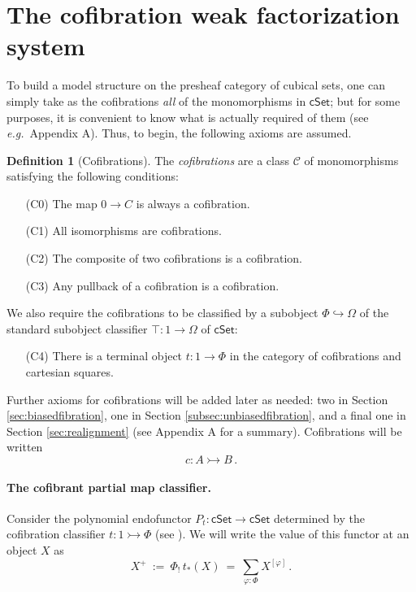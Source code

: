 \documentclass[11pt]{amsart}
\newcommand{\eg}{\emph{e.g.}}
\newcommand{\cSet}{\ensuremath{\mathsf{cSet}}}
\newcommand{\hook}{\ensuremath{\hookrightarrow}}
\newcommand{\mono}{\ensuremath{\rightarrowtail}}
\renewcommand{\to}{\ensuremath{\rightarrow}}
\theoremstyle{remark}
\theoremstyle{definition}
\newtheorem{definition}[theorem]{Definition}
\begin{document}
\section{The cofibration weak factorization system}\label{sec:cofibrations}

To build a model structure on the presheaf category of cubical sets, one can simply take as the cofibrations \emph{all} of the monomorphisms in $\cSet$; but for some purposes, it is convenient to know what is actually required of them (see \eg\ Appendix A). Thus, to begin, the following axioms are assumed.
 
\begin{definition}[Cofibrations]\label{def:cofibration}
The \emph{cofibrations} are a class $\mathcal{C}$ of monomorphisms satisfying the following conditions:
\begin{enumerate}
\item[(C0)] The map $0\to C$ is always a cofibration.
\item[(C1)] All isomorphisms are cofibrations.
\item[(C2)] The composite of two cofibrations is a cofibration.
\item[(C3)] Any pullback of a cofibration is a cofibration.
\end{enumerate}
We also require the cofibrations to be classified by a subobject $\Phi \hook \Omega$ of the standard subobject classifier $\top: 1 \to \Omega$ of $\mathsf{cSet}$:
\begin{enumerate}
\item[(C4)] There is a terminal object $t:1\to\Phi$ in the category of cofibrations and cartesian squares.
\end{enumerate}
Further axioms for cofibrations will be added later as needed: two in Section \ref{sec:biasedfibration}, one in Section \ref{subsec:unbiasedfibration}, and a final one in Section \ref{sec:realignment} (see Appendix A for a summary).  %
 Cofibrations will be written $$c : A \mono B\,.$$ 
\end{definition}

\paragraph{The cofibrant partial map classifier.}
Consider the polynomial endofunctor $P_t : \cSet\to \cSet$ determined by the cofibration classifier $t : 1 \mono \Phi$ (see  \cite{GK}).  We will write the value of this functor at an object $X$ as 
\begin{equation}\label{eq:partialmapclassifier}
X^+\ :=\ \Phi_!\,t_*(X)\ =\ \sum_{\varphi: \Phi}X^{[\varphi]}\,.
\end{equation}
\end{document}
